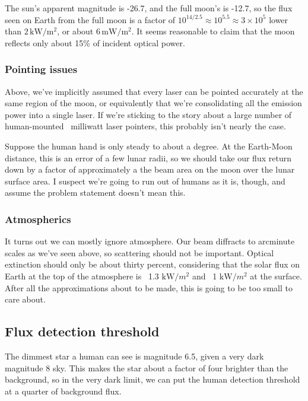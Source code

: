 \documentclass[12pt]{article}
\begin{document}
The sun's apparent magnitude is -26.7, and the full moon's is -12.7, so the flux seen on Earth from the full moon is a factor of \(10^{14/2.5} \approx 10^{5.5} \approx 3 \times 10^{5} \) lower than \( 2 \, \mathrm{kW} / \mathrm{m}^2\), or about \(6\,  \mathrm{mW} / \mathrm{m}^2\). It seems reasonable to claim that the moon reflects only about 15\% of incident optical power.

\subsubsection{Pointing issues}

Above, we've implicitly assumed that every laser can be pointed accurately at the same region of the moon, or equivalently that we're consolidating all the emission power into a single laser. If we're sticking to the story about a large number of human-mounted ~milliwatt laser pointers, this probably isn't nearly the case. 

Suppose the human hand is only steady to about a degree. At the Earth-Moon distance, this is an error of a few lunar radii, so we should take our flux return down by a factor of approximately a the beam area on the moon over the lunar surface area. I suspect we're going to run out of humans as it is, though, and assume the problem statement doesn't mean this.

\subsubsection{Atmospherics}

It turns out we can mostly ignore atmosphere. Our beam diffracts to arcminute scales as we've seen above, so scattering should not be important. Optical extinction should only be about thirty percent, considering that the solar flux on Earth at the top of the atmosphere is ~1.3 \(\mathrm{kW}/m^2\) and ~1 \(\mathrm{kW}/m^2\) at the surface. After all the approximations about to be made, this is going to be too small to care about.

\subsection{Flux detection threshold}

The dimmest star a human can see is magnitude 6.5, given a very dark magnitude 8 sky. This makes the star about a factor of four brighter than the background, so in the very dark limit, we can put the human detection threshold at a quarter of background flux.
\end{document}
